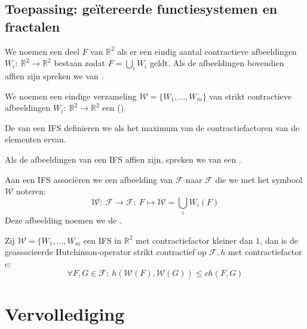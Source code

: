 \documentclass[main.tex]{subfiles}
\begin{document}
\subsection{Toepassing: ge\"itereerde functiesystemen en fractalen}
\label{sec:toep-geit-funct}

\begin{de}
  We noemen een deel $F$ van $\mathbb{R}^{2}$  als er een eindig aantal contractieve afbeeldingen $W_{i}:\ \mathbb{R}^{2} \rightarrow \mathbb{R}^{2}$ bestaan zodat $F = \bigcup_{i}W_{i}$ geldt.
  Als de afbeeldingen bovendien affien zijn spreken we van .
\end{de}

\begin{de}
  We noemen een eindige verzameling $\mathcal{W} = \{ W_{1}, \dotsc, W_{m}\}$ van strikt contractieve afbeeldingen $W_{i}:\ \mathbb{R}^{2}\rightarrow \mathbb{R}^{2}$ een  ().
\end{de}

\begin{de}
  De  van een IFS definieren we als het maximum van de contractiefactoren van de elementen ervan.
\end{de}

\begin{de}
  Als de afbeeldingen van een IFS affien zijn, spreken we van een .
\end{de}

\begin{de}
  Aan een IFS associ\"eren we een afbeelding van $\mathcal{F}$ naar $\mathcal{F}$ die we met het symbool $\mathcal{W}$ noteren:
  \[ \mathcal{W}:\ \mathcal{F} \rightarrow \mathcal{F}:\ F \mapsto \mathcal{W} = \bigcup_{i}W_{i}(F) \]
  Deze afbeelding noemen we de .
\end{de}

\begin{bpr}
  Zij $\mathcal{W} = \{ W_{1}, \dotsc, W_{m}$ een IFS in $\mathbb{R}^{2}$ met contractiefactor kleiner dan $1$, dan is de geassocieerde Hutchinson-operator strikt contractief op $\mathcal{F},h$ met contractiefactor $c$:
  \[ \forall F,G \in \mathcal{F}:\ h\left(\mathcal{W}(F), \mathcal{W}(G)\right) \le c h(F,G) \]
\end{bpr}



\section{Vervollediging}
\label{sec:vervollediging}
\end{document}
